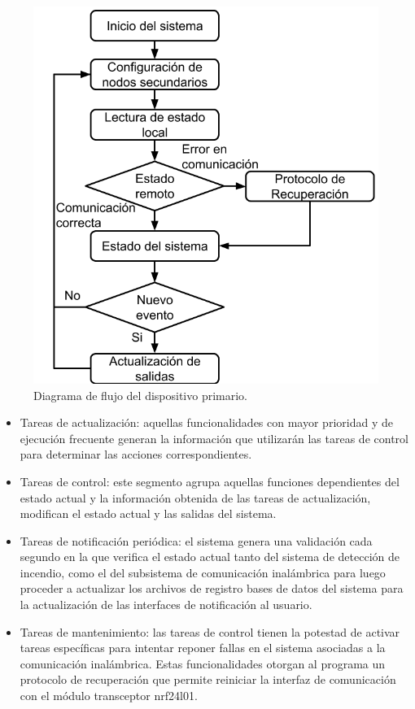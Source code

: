 \begin{figure}[]
	\centering
	\includegraphics[scale=.3]{./Figures/Capitulo3/Fig_Fl_Pri.png}
	\caption{Diagrama de flujo del dispositivo primario.}
	\label{fig:figura_disp_prim}
\end{figure} 

\begin{itemize}
\item Tareas de actualización: aquellas funcionalidades con mayor prioridad y de ejecución frecuente generan la información que utilizarán las tareas de control para determinar las acciones correspondientes.
\item Tareas de control: este segmento agrupa aquellas funciones dependientes del estado actual y la información obtenida de las tareas de actualización, modifican el estado actual y las salidas del sistema. 
\item Tareas de notificación periódica: el sistema genera una validación cada segundo en la que verifica el estado actual tanto del sistema de detección de incendio, como el del subsistema de comunicación inalámbrica para luego proceder a actualizar los archivos de registro bases de datos del sistema para la actualización de las interfaces de notificación al usuario.
\item Tareas de mantenimiento: las tareas de control tienen la potestad de activar tareas específicas para intentar reponer fallas en el sistema asociadas a la comunicación inalámbrica. Estas funcionalidades otorgan al programa un protocolo de recuperación que permite reiniciar la interfaz de comunicación con el módulo transceptor nrf24l01.
\end{itemize}

